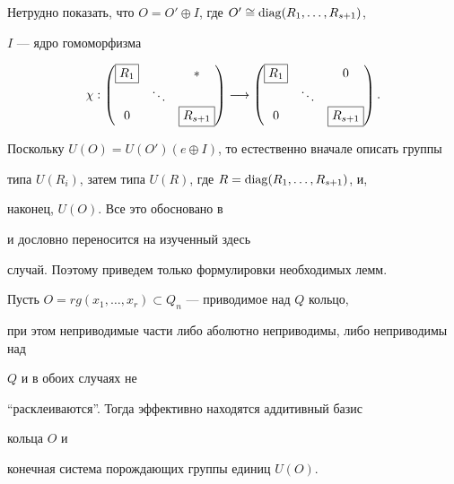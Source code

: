 Нетрудно показать, что $O=O'\oplus I$, где $O'\cong \operatorname{diag}(R_1,\dotsc,R_{s+1})$,


$I$ --- ядро гомоморфизма


\begin{equation}


\chi :


\begin{pmatrix}


\framebox{$R_1$} & & * \\ 


& \ddots & \\ 


0 & & \framebox{$R_{s+1}$}


\end{pmatrix}


\longrightarrow


\begin{pmatrix}


\framebox{$R_1$} & & 0 \\ 


& \ddots & \\ 


0 & & \framebox{$R_{s+1}$}


\end{pmatrix}


.


\end{equation}





Поскольку $U(O)=U(O')(e\oplus I)$, то естественно вначале описать группы


типа $U(R_i)$, затем типа $U(R)$, где $R=\operatorname{diag}(R_1,\dotsc,R_{s+1})$, и,


наконец, $U(O)$. Все это обосновано в \cite{Pop7} 


и дословно переносится на изученный здесь


случай. Поэтому приведем только формулировки необходимых лемм.








\begin{lem}


Пусть $ O=rg(x_1,\dotsc,x_r)\subset Q_n $ --- приводимое над $Q$ кольцо,


при этом неприводимые части либо аболютно неприводимы, либо неприводимы над 


$Q$ и в обоих случаях не


``расклеиваются''. Тогда эффективно находятся аддитивный базис


кольца $O$ и


конечная система порождающих группы единиц $U(O)$.


\end{lem}








